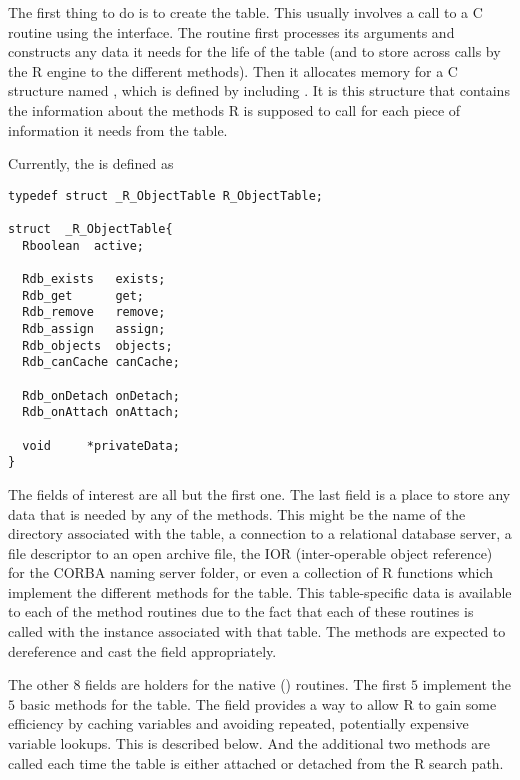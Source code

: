 \documentclass{article}
\begin{document}
The first thing to do is to create the table.  This usually involves a
call to a C routine using the  interface.  The
routine first processes its arguments and constructs any data it needs
for the life of the table (and to store across calls by the R engine
to the different methods).  Then it allocates memory for a C structure
named , which is defined by including
.  It is this structure that contains the
information about the methods R is supposed to call for each piece of
information it needs from the table.

Currently, the  is defined as
\begin{verbatim}
typedef struct _R_ObjectTable R_ObjectTable;

struct  _R_ObjectTable{
  Rboolean  active;

  Rdb_exists   exists;
  Rdb_get      get;
  Rdb_remove   remove;
  Rdb_assign   assign;
  Rdb_objects  objects;
  Rdb_canCache canCache;

  Rdb_onDetach onDetach;
  Rdb_onAttach onAttach;
  
  void     *privateData;
}
\end{verbatim}
The fields of interest are all but the first one.  The last field is a
place to store any data that is needed by any of the methods.  This
might be the name of the directory associated with the table, a
connection to a relational database server, a file descriptor to an
open archive file, the IOR (inter-operable object reference) for the
CORBA naming server folder, or even a collection of R functions which
implement the different methods for the table.  This table-specific
data is available to each of the method routines due to the fact that
each of these routines is called with the 
instance associated with that table. The methods are expected to
dereference and cast the  field appropriately.


The other $8$ fields are holders for the native (\C) routines.  The
first $5$ implement the $5$ basic methods for the table.  The
 field provides a way to allow R to gain some
efficiency by caching variables and avoiding repeated, potentially
expensive variable lookups. This is described below.  And the
additional two methods are called each time the table is either
attached or detached from the R search path.
\end{document}
